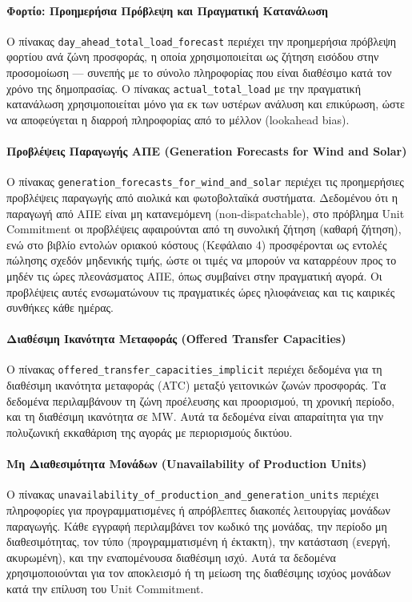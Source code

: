 \paragraph{Φορτίο: Προημερήσια Πρόβλεψη και Πραγματική Κατανάλωση}
Ο πίνακας \texttt{day\_ahead\_total\_load\_forecast} περιέχει την προημερήσια πρόβλεψη φορτίου ανά ζώνη προσφοράς, η οποία χρησιμοποιείται ως ζήτηση εισόδου στην προσομοίωση --- συνεπής με το σύνολο πληροφορίας που είναι διαθέσιμο κατά τον χρόνο της δημοπρασίας. Ο πίνακας \texttt{actual\_total\_load} με την πραγματική κατανάλωση χρησιμοποιείται μόνο για εκ των υστέρων ανάλυση και επικύρωση, ώστε να αποφεύγεται η διαρροή πληροφορίας από το μέλλον (lookahead bias).

\paragraph{Προβλέψεις Παραγωγής ΑΠΕ (Generation Forecasts for Wind and Solar)}
Ο πίνακας \texttt{generation\_forecasts\_for\_wind\_and\_solar} περιέχει τις προημερήσιες προβλέψεις παραγωγής από αιολικά και φωτοβολταϊκά συστήματα. Δεδομένου ότι η παραγωγή από ΑΠΕ είναι μη κατανεμόμενη (non-dispatchable), στο πρόβλημα Unit Commitment οι προβλέψεις αφαιρούνται από τη συνολική ζήτηση (καθαρή ζήτηση), ενώ στο βιβλίο εντολών οριακού κόστους (Κεφάλαιο 4) προσφέρονται ως εντολές πώλησης σχεδόν μηδενικής τιμής, ώστε οι τιμές να μπορούν να καταρρέουν προς το μηδέν τις ώρες πλεονάσματος ΑΠΕ, όπως συμβαίνει στην πραγματική αγορά. Οι προβλέψεις αυτές ενσωματώνουν τις πραγματικές ώρες ηλιοφάνειας και τις καιρικές συνθήκες κάθε ημέρας.

\paragraph{Διαθέσιμη Ικανότητα Μεταφοράς (Offered Transfer Capacities)}
Ο πίνακας \texttt{offered\_transfer\_capacities\_implicit} περιέχει δεδομένα για τη διαθέσιμη ικανότητα μεταφοράς (ATC) μεταξύ γειτονικών ζωνών προσφοράς. Τα δεδομένα περιλαμβάνουν τη ζώνη προέλευσης και προορισμού, τη χρονική περίοδο, και τη διαθέσιμη ικανότητα σε MW. Αυτά τα δεδομένα είναι απαραίτητα για την πολυζωνική εκκαθάριση της αγοράς με περιορισμούς δικτύου.

\paragraph{Μη Διαθεσιμότητα Μονάδων (Unavailability of Production Units)}
Ο πίνακας \texttt{unavailability\_of\_production\_and\_generation\_units} περιέχει πληροφορίες για προγραμματισμένες ή απρόβλεπτες διακοπές λειτουργίας μονάδων παραγωγής. Κάθε εγγραφή περιλαμβάνει τον κωδικό της μονάδας, την περίοδο μη διαθεσιμότητας, τον τύπο (προγραμματισμένη ή έκτακτη), την κατάσταση (ενεργή, ακυρωμένη), και την εναπομένουσα διαθέσιμη ισχύ. Αυτά τα δεδομένα χρησιμοποιούνται για τον αποκλεισμό ή τη μείωση της διαθέσιμης ισχύος μονάδων κατά την επίλυση του Unit Commitment.

